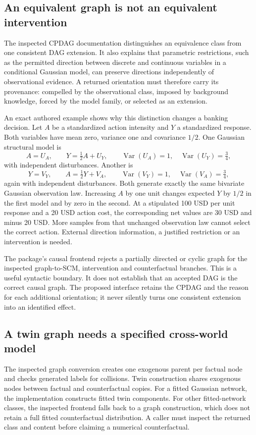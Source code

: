 \subsection{An equivalent graph is not an equivalent intervention}
The inspected CPDAG documentation distinguishes an equivalence class from one consistent DAG extension. It also explains that parametric restrictions, such as the permitted direction between discrete and continuous variables in a conditional Gaussian model, can preserve directions independently of observational evidence. A returned orientation must therefore carry its provenance: compelled by the observational class, imposed by background knowledge, forced by the model family, or selected as an extension.\citep{exec24_bnlearn_sources}

An exact authored example shows why this distinction changes a banking decision. Let $A$ be a standardized action intensity and $Y$ a standardized response. Both variables have mean zero, variance one and covariance $1/2$. One Gaussian structural model is
\[
 A=U_A,\qquad Y=\tfrac12 A+U_Y,
 \qquad \operatorname{Var}(U_A)=1,\quad \operatorname{Var}(U_Y)=\tfrac34,
\]
with independent disturbances. Another is
\[
 Y=V_Y,\qquad A=\tfrac12 Y+V_A,
 \qquad \operatorname{Var}(V_Y)=1,\quad \operatorname{Var}(V_A)=\tfrac34,
\]
again with independent disturbances. Both generate exactly the same bivariate Gaussian observation law. Increasing $A$ by one unit changes expected $Y$ by $1/2$ in the first model and by zero in the second. At a stipulated 100 USD per unit response and a 20 USD action cost, the corresponding net values are 30 USD and minus 20 USD. More samples from that unchanged observation law cannot select the correct action. External direction information, a justified restriction or an intervention is needed.\citep{exec24_bnlearn_contract}

The package's causal frontend rejects a partially directed or cyclic graph for the inspected graph-to-SCM, intervention and counterfactual branches. This is a useful syntactic boundary. It does not establish that an accepted DAG is the correct causal graph. The proposed interface retains the CPDAG and the reason for each additional orientation; it never silently turns one consistent extension into an identified effect.\citep{exec24_bnlearn_sources,exec24_bnlearn_contract}

\subsection{A twin graph needs a specified cross-world model}
The inspected graph conversion creates one exogenous parent per factual node and checks generated labels for collisions. Twin construction shares exogenous nodes between factual and counterfactual copies. For a fitted Gaussian network, the implementation constructs fitted twin components. For other fitted-network classes, the inspected frontend falls back to a graph construction, which does not retain a full fitted counterfactual distribution. A caller must inspect the returned class and content before claiming a numerical counterfactual.\citep{exec24_bnlearn_sources}

